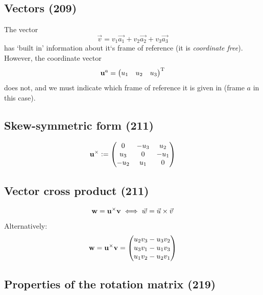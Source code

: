 \documentclass[a4paper, 12pt]{article}
\begin{document}
\subsection{Vectors (209)}
The vector
\begin{equation}
	\vec{v} = v_1 \vec{a_1} + v_2 \vec{a_2} + v_3 \vec{a_3}
\end{equation}
has `built in' information about it`s frame of reference (it is \emph{coordinate free}). However, the coordinate vector
\begin{equation}
	\mathbf{u}^a =
	\begin{pmatrix}
		u_1 & u_2 & u_3 \\
	\end{pmatrix}
	^{\text{T}}
\end{equation}
does not, and we must indicate which frame of reference it is given in (frame \(a\) in this case).

\subsection{Skew-symmetric form (211)}
\begin{equation}
	\mathbf{u}^\times :=
	\begin{pmatrix}
		0    & -u_3 & u_2  \\
		u_3  & 0    & -u_1 \\
		-u_2 & u_1  & 0    \\
	\end{pmatrix}
\end{equation}

\subsection{Vector cross product (211)}
\begin{equation}
	\mathbf{w} = \mathbf{u}^\times \mathbf{v}
	\iff
	\vec{w} = \vec{u} \times \vec{v}
\end{equation}
Alternatively:
\begin{equation}
	\mathbf{w} = \mathbf{u}^\times \mathbf{v} =
	\begin{pmatrix}
		u_2 v_3 - u_3 v_2 \\
		u_3 v_1 - u_1 v_3 \\
		u_1 v_2 - u_2 v_1 \\
	\end{pmatrix}
\end{equation}

\subsection{Properties of the rotation matrix (219)}
\end{document}
